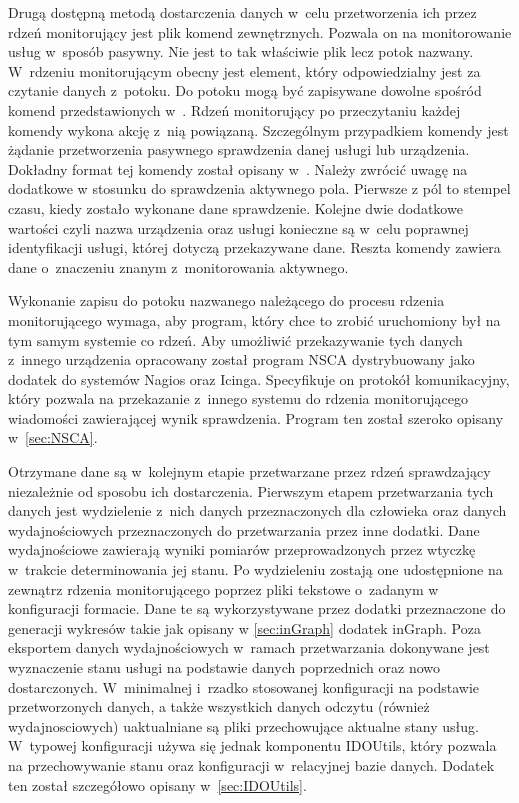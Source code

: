 Drugą dostępną metodą dostarczenia danych w~celu przetworzenia ich
przez rdzeń monitorujący jest plik komend zewnętrznych. Pozwala on na
monitorowanie usług w~sposób pasywny. Nie jest to tak właściwie plik
lecz potok nazwany. W~rdzeniu monitorującym obecny jest element, który
odpowiedzialny jest za czytanie danych z~potoku. Do potoku mogą być
zapisywane dowolne spośród komend przedstawionych
w~\cite[412-436]{www:IcingaDoc}. Rdzeń monitorujący po przeczytaniu
każdej komendy wykona akcję z~nią powiązaną. Szczególnym przypadkiem
komendy jest żądanie przetworzenia pasywnego sprawdzenia danej usługi
lub urządzenia. Dokładny format tej komendy został opisany
w~\cite[296-299]{www:IcingaDoc}. Należy zwrócić uwagę na dodatkowe w
stosunku do sprawdzenia aktywnego pola. Pierwsze z pól to stempel
czasu, kiedy zostało wykonane dane sprawdzenie. Kolejne dwie dodatkowe
wartości czyli nazwa urządzenia oraz usługi konieczne są w~celu
poprawnej identyfikacji usługi, której dotyczą przekazywane
dane. Reszta komendy zawiera dane o~znaczeniu znanym z~monitorowania
aktywnego.

Wykonanie zapisu do potoku nazwanego należącego do procesu rdzenia
monitorującego wymaga, aby program, który chce to zrobić uruchomiony
był na tym samym systemie co rdzeń. Aby umożliwić przekazywanie tych
danych z~innego urządzenia opracowany został program NSCA
dystrybuowany jako dodatek do systemów Nagios oraz Icinga. Specyfikuje
on protokół komunikacyjny, który pozwala na przekazanie z~innego
systemu do rdzenia monitorującego wiadomości zawierającej wynik
sprawdzenia. Program ten został szeroko opisany w~\ref{sec:NSCA}.


Otrzymane dane są w~kolejnym etapie przetwarzane przez rdzeń
sprawdzający niezależnie od sposobu ich dostarczenia. Pierwszym etapem
przetwarzania tych danych jest wydzielenie z~nich danych
przeznaczonych dla człowieka oraz danych wydajnościowych
przeznaczonych do przetwarzania przez inne dodatki. Dane wydajnościowe
zawierają wyniki pomiarów przeprowadzonych przez wtyczkę w~trakcie
determinowania jej stanu. Po wydzieleniu zostają one udostępnione na
zewnątrz rdzenia monitorującego poprzez pliki tekstowe o~zadanym w
konfiguracji formacie. Dane te są wykorzystywane przez dodatki
przeznaczone do generacji wykresów takie jak opisany w
\ref{sec:inGraph} dodatek inGraph. Poza eksportem danych
wydajnościowych w~ramach przetwarzania dokonywane jest wyznaczenie
stanu usługi na podstawie danych poprzednich oraz nowo
dostarczonych. W~minimalnej i~rzadko stosowanej konfiguracji na
podstawie przetworzonych danych, a także wszystkich danych odczytu
(również wydajnosciowych) uaktualniane są pliki przechowujące aktualne
stany usług. W~typowej konfiguracji używa się jednak komponentu
IDOUtils, który pozwala na przechowywanie stanu oraz konfiguracji
w~relacyjnej bazie danych. Dodatek ten został szczegółowo opisany
w~\ref{sec:IDOUtils}.


